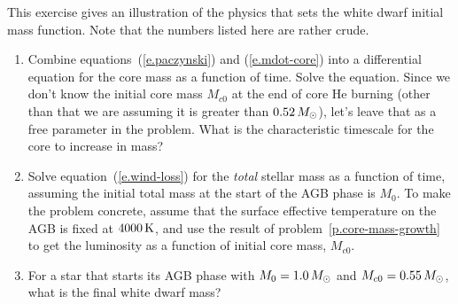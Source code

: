 \newpage
\begin{exercisebox}
This exercise gives an illustration of the physics that sets the white dwarf initial mass function.
Note that the numbers listed here are rather crude.

\begin{enumerate}
\item\label{p.core-mass-growth} Combine equations~(\ref{e.paczynski}) and (\ref{e.mdot-core}) into a differential equation for the core mass as a function of time.  Solve the equation.  Since we don't know the initial core mass $M_{c0}$ at the end of core He burning (other than that we are assuming it is greater than $0.52\,M_\odot$), let's leave that as a free parameter in the problem. What is the characteristic timescale for the core to increase in mass?

\item Solve equation~(\ref{e.wind-loss}) for the \emph{total} stellar mass as a function of time, assuming the initial total mass at the start of the AGB phase is $M_{0}$.  To make the problem concrete, assume that
 the surface effective temperature on the AGB is fixed at $4000\,\mathrm{K}$,  and use the result of problem~\ref{p.core-mass-growth} to get the luminosity as a function of initial core mass, $M_{c0}$.

\item For a star that starts its AGB phase with $M_{0} = 1.0\,M_\odot$ and $M_{c0}=0.55\,M_\odot$, what is the final white dwarf mass?
\end{enumerate}
\end{exercisebox}
